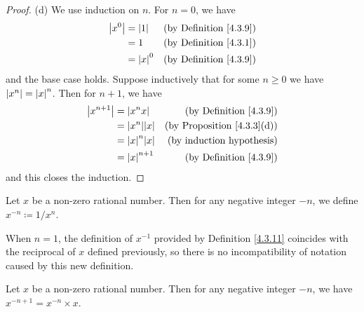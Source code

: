 \begin{proof}{(d)}
    We use induction on \(n\).
    For \(n = 0\), we have
    \begin{align*}
        \abs*{x^0} & = \abs*{1}   & \text{(by Definition \ref{4.3.9})} \\
                   & = 1          & \text{(by Definition \ref{4.3.1})} \\
                   & = \abs*{x}^0 & \text{(by Definition \ref{4.3.9})}
    \end{align*}
    and the base case holds.
    Suppose inductively that for some \(n \geq 0\) we have \(\abs*{x^n} = \abs*{x}^n\).
    Then for \(n + 1\), we have
    \begin{align*}
        \abs*{x^{n + 1}} & = \abs*{x^n x}        & \text{(by Definition \ref{4.3.9})}     \\
                         & = \abs*{x^n} \abs*{x} & \text{(by Proposition \ref{4.3.3}(d))} \\
                         & = \abs*{x}^n \abs*{x} & \text{(by induction hypothesis)}       \\
                         & = \abs*{x}^{n + 1}    & \text{(by Definition \ref{4.3.9})}
    \end{align*}
    and this closes the induction.
\end{proof}

\begin{definition}\label{4.3.11}
    Let \(x\) be a non-zero rational number.
    Then for any negative integer \(-n\), we define \(x^{-n} \coloneqq 1 / x^n\).
\end{definition}

\begin{note}
    When \(n = 1\), the definition of \(x^{-1}\) provided by Definition \ref{4.3.11} coincides with the reciprocal of \(x\) defined previously, so there is no incompatibility of notation caused by this new definition.
\end{note}

\begin{additional corollary}\label{ac 4.3.2}
Let \(x\) be a non-zero rational number.
Then for any negative integer \(-n\), we have \(x^{-n + 1} = x^{-n} \times x\).
\end{additional corollary}

